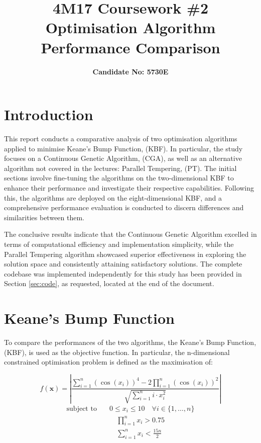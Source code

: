 \documentclass[10pt]{article}
\title{\textbf{4M17 Coursework \#2 \\ Optimisation Algorithm Performance Comparison}}
\author{\textbf{Candidate No: 5730E}}
\begin{document}

\vspace{-3cm}
\maketitle
\begin{multicols}{2}
\section{Introduction}
This report conducts a comparative analysis of two optimisation algorithms applied to minimise Keane's Bump Function, (KBF). In particular, the study focuses on a Continuous Genetic Algorithm, (CGA), as well as an alternative algorithm not covered in the lectures: Parallel Tempering, (PT). The initial sections involve fine-tuning the algorithms on the two-dimensional KBF to enhance their performance and investigate their respective capabilities. Following this, the algorithms are deployed on the eight-dimensional KBF, and a comprehensive performance evaluation is conducted to discern differences and similarities between them. 


The conclusive results indicate that the Continuous Genetic Algorithm excelled in terms of computational efficiency and implementation simplicity, while the Parallel Tempering algorithm showcased superior effectiveness in exploring the solution space and consistently attaining satisfactory solutions. The complete codebase was implemented independently for this study has been provided in Section \ref{sec:code}, as requested, located at the end of the document.
\section{Keane's Bump Function}

To compare the performances of the two algorithms, the Keane's Bump Function, (KBF), is used as the objective function. In particular, the n-dimensional constrained optimisation problem is defined as the maximisation of:

\begin{equation}
    f(\mathbf{x}) = \left| \frac{\sum_{i=1}^{n} (\cos(x_i))^4 - 2\prod_{i=1}^{n} (\cos(x_i))^2}{\sqrt{\sum_{i=1}^{n} i \cdot x_i^2}} \right|
    \label{eq:KBF_cost}
\end{equation}
\begin{equation}
    \begin{aligned}
        \text{subject to} \quad & 0 \leq x_i \leq 10 \quad \forall i \in \{1, \dots, n\} \\
        & \quad \prod_{i=1}^{n} x_i > 0.75 \\
        & \quad \sum_{i=1}^{n} x_i < \frac{15n}{2}
    \end{aligned} 
    \label{eq:KBF_constraints}
\end{equation}


\end{multicols}
\end{document}
